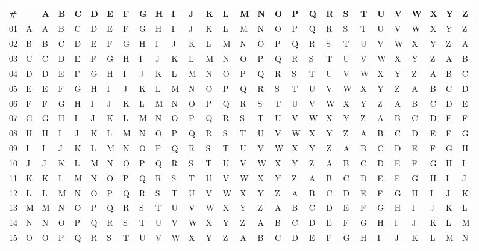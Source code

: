 \documentclass[landscape,twocolumn,a4paper]{article}
\begin{document}
{
\setlength{\tabcolsep}{0.15em}
\begin{tabular}{l l| l l l l l l l l l l l l l l l l l l l l l l l l l l}
\# &  & A & B & C & D & E & F & G & H & I & J & K & L & M & N & O & P & Q & R & S & T & U & V & W & X & Y & Z\\
\hline
01 & A & A & B & C & D & E & F & G & H & I & J & K & L & M & N & O & P & Q & R & S & T & U & V & W & X & Y & Z\\
02 & B & B & C & D & E & F & G & H & I & J & K & L & M & N & O & P & Q & R & S & T & U & V & W & X & Y & Z & A\\
03 & C & C & D & E & F & G & H & I & J & K & L & M & N & O & P & Q & R & S & T & U & V & W & X & Y & Z & A & B\\
04 & D & D & E & F & G & H & I & J & K & L & M & N & O & P & Q & R & S & T & U & V & W & X & Y & Z & A & B & C\\
05 & E & E & F & G & H & I & J & K & L & M & N & O & P & Q & R & S & T & U & V & W & X & Y & Z & A & B & C & D\\
06 & F & F & G & H & I & J & K & L & M & N & O & P & Q & R & S & T & U & V & W & X & Y & Z & A & B & C & D & E\\
07 & G & G & H & I & J & K & L & M & N & O & P & Q & R & S & T & U & V & W & X & Y & Z & A & B & C & D & E & F\\
08 & H & H & I & J & K & L & M & N & O & P & Q & R & S & T & U & V & W & X & Y & Z & A & B & C & D & E & F & G\\
09 & I & I & J & K & L & M & N & O & P & Q & R & S & T & U & V & W & X & Y & Z & A & B & C & D & E & F & G & H\\
10 & J & J & K & L & M & N & O & P & Q & R & S & T & U & V & W & X & Y & Z & A & B & C & D & E & F & G & H & I\\
11 & K & K & L & M & N & O & P & Q & R & S & T & U & V & W & X & Y & Z & A & B & C & D & E & F & G & H & I & J\\
12 & L & L & M & N & O & P & Q & R & S & T & U & V & W & X & Y & Z & A & B & C & D & E & F & G & H & I & J & K\\
13 & M & M & N & O & P & Q & R & S & T & U & V & W & X & Y & Z & A & B & C & D & E & F & G & H & I & J & K & L\\
14 & N & N & O & P & Q & R & S & T & U & V & W & X & Y & Z & A & B & C & D & E & F & G & H & I & J & K & L & M\\
15 & O & O & P & Q & R & S & T & U & V & W & X & Y & Z & A & B & C & D & E & F & G & H & I & J & K & L & M & N\\

\end{tabular}}
\end{document}
